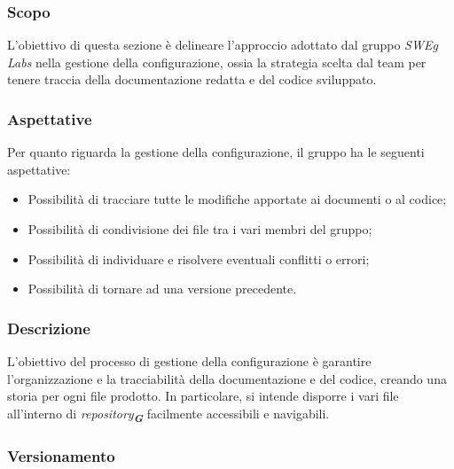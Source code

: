 \subsubsection{Scopo}
L’obiettivo di questa sezione è delineare l’approccio adottato dal gruppo \emph{SWEg Labs} nella 
gestione della configurazione, ossia la strategia scelta dal team per tenere traccia della
documentazione redatta e del codice sviluppato.

\subsubsection{Aspettative}
Per quanto riguarda la gestione della configurazione, il gruppo ha le seguenti aspettative:
\begin{itemize}
    \item Possibilità di tracciare tutte le modifiche apportate ai documenti o al codice;
    \item Possibilità di condivisione dei file tra i vari membri del gruppo;
    \item Possibilità di individuare e risolvere eventuali conflitti o errori;
    \item Possibilità di tornare ad una versione precedente.
\end{itemize}

\subsubsection{Descrizione}
L’obiettivo del processo di gestione della configurazione è garantire l’organizzazione e la
tracciabilità della documentazione e del codice, creando una storia per ogni file prodotto.
In particolare, si intende disporre i vari file all’interno di \emph{repository}\textsubscript{\textit{\textbf{G}}} 
facilmente accessibili e navigabili.


\subsubsection{Versionamento}

